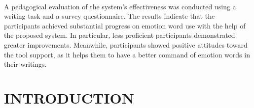 \documentclass[a4paper,12pt,oneside]{article}
\begin{document}
\paragraph{}

A pedagogical evaluation of the system’s effectiveness was conducted using a writing task and a survey questionnaire. The results indicate that the participants achieved substantial progress on emotion word use with the help of the proposed system. In particular, less proficient participants demonstrated greater improvements. Meanwhile, participants showed positive attitudes toward the tool support, as it helps them to have a better command of emotion words in their writings.
\setlength{\baselineskip}{1.0\baselineskip}
\newpage
\begin{center}
\tableofcontents
\end{center}
\newpage
\thispagestyle{plain}
\begin{center}
\listoffigures
\end{center}





\newpage
\rfoot{\thepage}



\rfoot{\thepage}

\renewcommand{\headrulewidth}{0.0pt}
\renewcommand{\footrulewidth}{0.0pt}




\renewcommand{\headrulewidth}{0.0pt}
\renewcommand{\footrulewidth}{0.0pt}



\section{INTRODUCTION}
\end{document}
